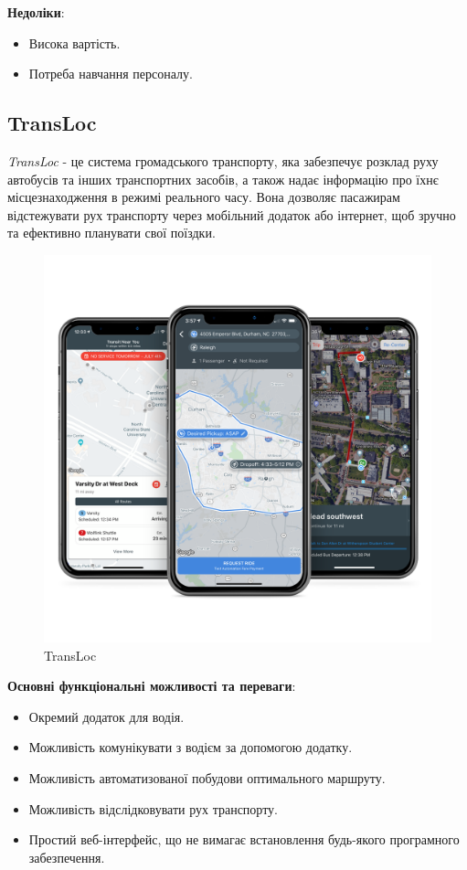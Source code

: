 \documentclass[14pt]{extreport}
\begin{document}
\begin{normalsize}
	\textbf{Недоліки}:
	\begin{itemize}
		\item Висока вартість.
		\item Потреба навчання персоналу.
	\end{itemize}
	
	\subsection*{TransLoc}
	\textit{TransLoc} - це система громадського транспорту, яка забезпечує розклад руху автобусів та інших транспортних засобів, а також надає інформацію про їхнє місцезнаходження в режимі реального часу. Вона дозволяє пасажирам відстежувати рух транспорту через мобільний додаток або інтернет, щоб зручно та ефективно планувати свої поїздки.
	
	\begin{figure}[H]
		\centering
		\includegraphics[scale=0.45]{4}
		\caption{TransLoc}
	\end{figure}
	
	\textbf{Основні функціональні можливості та переваги}:
	\begin{itemize}
		\item Окремий додаток для водія.
		\item Можливість комунікувати з водієм за допомогою додатку.
		\item Можливість автоматизованої побудови оптимального маршруту.
		\item Можливість відслідковувати рух транспорту.
		\item Простий веб-інтерфейс, що не вимагає встановлення будь-якого програмного забезпечення.
	\end{itemize}
	

\end{normalsize}
\end{document}
